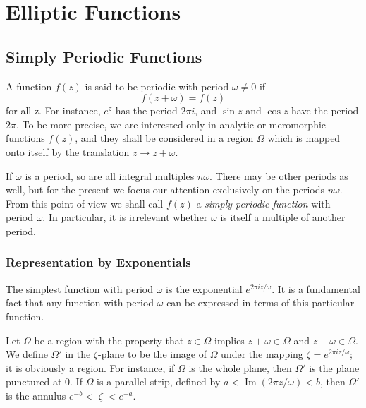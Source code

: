 \chapter{Elliptic Functions}\label{chap:7}

\setcounter{section}{0}\section{Simply Periodic Functions}\label{sec:7.1}
A function $f(z)$ is said to be periodic with period $\omega \neq 0$ if
\begin{equation*}
f (z + \omega) = f (z)
\end{equation*}
for all z. For instance, $e^{z}$ has the period $2\pi i$, and $\sin z$ and $\cos z$ have the period $2\pi$. To be more precise, we are interested only in analytic or meromorphic functions $f(z)$, and they shall be considered in a region $\Omega$ which is mapped onto itself by the translation $z \to z + \omega$.

If $\omega$ is a period, so are all integral multiples $n\omega$. There may be other periods as well, but for the present we focus our attention exclusively on the periods $n\omega$. From this point of view we shall call $f(z)$ a \emph{simply periodic function} with period $\omega$. In particular, it is irrelevant whether $\omega$ is itself a multiple of another period.

\setcounter{section}{1}\setcounter{subsection}{0}\subsection{Representation by Exponentials}\label{sec:7.1.1}
The simplest function with period $\omega$ is the exponential $e^{2\pi iz/\omega}$. It is a fundamental fact that any function with period $\omega$ can be expressed in terms of this particular function.

Let $\Omega$ be a region with the property that $z \in \Omega$ implies $z + \omega \in \Omega$ and $z - \omega \in \Omega$. We define $\Omega'$ in the $\zeta$-plane to be the image of $\Omega$ under the mapping $\zeta = e^{2\pi iz / \omega}$; it is obviously a region. For instance, if $\Omega$ is the whole plane, then $\Omega'$ is the plane punctured at 0. If $\Omega$ is a parallel strip, defined by $a < \operatorname{Im}(2\pi z / \omega) < b$, then $\Omega'$ is the annulus $e^{-b} < |\zeta| < e^{-a}$.


